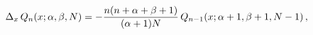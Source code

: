 \[\Delta_{x}\mathop{Q_{n}\/}\nolimits\!\left(x;\alpha,\beta,N\right)=-\frac{n(n+%
\alpha+\beta+1)}{(\alpha+1)N}\mathop{Q_{n-1}\/}\nolimits\!\left(x;\alpha+1,%
\beta+1,N-1\right),\]